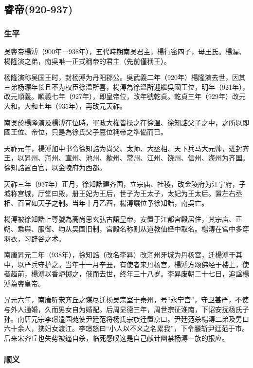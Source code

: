 
\subsection{睿帝\tiny(920-937)}

\subsubsection{生平}

吳睿帝楊溥（900年－938年），五代時期南吳君主，楊行密四子，母王氏。楊渥、楊隆演之弟，南吳唯一正式稱帝的君主（先前僅稱王）。

杨隆演称吴国王时，封杨溥为丹阳郡公。吳武義二年（920年）楊隆演去世，因其三弟杨濛年长且不为权臣徐温所喜，楊溥為徐溫所迎繼吳國王位，明年（921年），改元順義。順義七年（927年），即皇帝位，改年號乾貞。乾貞三年（929年）改元大和。大和七年（935年），再改元天祚。

南吳於楊隆演及楊溥在位時，軍政大權皆操之在徐溫、徐知誥父子之中，之所以即國王位、帝位，只是為徐氏父子篡位稱帝之準備而已。

天祚元年，楊溥加中书令徐知誥为尚父、太师、大丞相、天下兵马大元帅，进封齐王，以昇州、润州、宣州、池州、歙州、常州、江州、饶州、信州、海州为齐国。徐知誥置百官，以金陵府为西都。

天祚三年（937年）正月，徐知誥建齐国，立宗庙、社稷，改金陵府为江宁府，子城称宫城，厅堂曰殿，册王妃为王后，世子为王太子，太妃为王太后。置左右丞相、百官如天子之制。当年十月乙酉，楊溥讓位予徐知誥，南吳亡。

楊溥被徐知誥上尊號為高尚思玄弘古讓皇帝，安置于江都宫殿居住，其宗庙、正朔、乘舆、服御、均从吴国旧制，宫殿名称则从道教仙经中取名。楊溥在宫中多穿羽衣，习辟谷之术。

南唐昇元二年（938年），徐知誥（改名李昪）改润州牙城为丹杨宫，迁楊溥于其中，以严兵守护之。当年十一月辛丑，有使者来丹杨宫，楊溥方颂佛经于楼上，使者趋前，楊溥以香炉掷之，俄而去世，终年三十八岁。李昪废朝二十七日，追諡楊溥為睿皇帝。

昇元六年，南唐听宋齐丘之谋尽迁杨吴宗室于泰州，号“永宁宫”，守卫甚严，不使与外人通婚，久而男女自为婚配。后周显德三年，周世宗征淮南，下诏安抚杨氏子孙。南唐元宗李璟遣园苑使尹廷范将杨氏宗族迁置京口。尹廷范杀楊溥二弟及男口六十余人，携妇女渡江。李璟怒曰“小人以不义之名累我”，下令腰斩尹廷范于市。后来宋齐丘也失势被逼自杀，临死感叹这是自己献计幽禁杨溥一族的报应。


\subsubsection{顺义}

